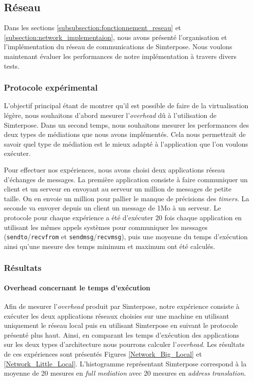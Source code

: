 \subsection{Réseau}
\label{subsection:res}

Dans les sections \ref{subsubsection:fonctionnement_reseau} et \ref{subsection:network_implementaion}, nous avons présenté l'organisation et l'implémentation du réseau de communications de Simterpose. Nous voulons maintenant évaluer les performances de notre implémentation à travers divers tests.

\subsubsection{Protocole expérimental}
L'objectif principal étant de montrer qu'il est possible de faire de la virtualisation légère, nous souhaitons d'abord mesurer l'\textit{overhead} dû à l'utilisation de Simterpose. Dans un second temps, nous souhaitons mesurer les performances des deux types de médiations que nous avons implémentés. Cela nous permettrait de savoir quel type de médiation est le mieux adapté à l'application que l'on voulons exécuter.

Pour effectuer nos expériences, nous avons choisi deux applications réseau d'échanges de messages. La première application consiste à faire communiquer un client et un serveur en envoyant au serveur un million de messages de petite taille. On en envoie un million pour pallier le manque de précisions des \textit{timers}. La seconde va envoyer depuis un client un message de 1Mo à un serveur. Le protocole pour chaque expérience a été d'exécuter 20 fois chaque application en utilisant les mêmes appels systèmes pour communiquer les messages (\texttt{sendto}/\texttt{recvfrom} et \texttt{sendmsg}/\texttt{recvmsg}), puis une moyenne du temps d'exécution ainsi qu'une mesure des temps minimum et maximum ont été calculés.

\subsubsection{Résultats}
\paragraph{Overhead concernant le temps d'exécution}
Afin de mesurer l'\textit{overhead} produit par Simterpose, notre expérience consiste à exécuter les deux applications réseaux choisies sur une machine en utilisant uniquement le réseau local puis en utilisant Simterpose en suivant le protocole présenté plus haut. Ainsi, en comparant les temps d'exécution des applications sur les deux types d'architecture nous pourrons calculer l'\textit{overhead}. Les résultats de ces expériences sont présentés Figures \ref{Network_Big_Local} et \ref{Network_Little_Local}. L'histogramme représentant Simterpose correspond à la moyenne de 20 mesures en \textit{full mediation} avec 20 mesures en \textit{address translation}.

